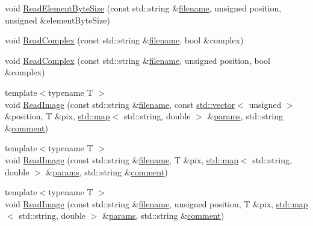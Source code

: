 \begin{DoxyCompactItemize}
\item 
void \hyperlink{class_q_s_t_e_m_1_1_i_data_reader_a00226e15483bff70932930ffafc998c9}{Read\-Element\-Byte\-Size} (const std\-::string \&\hyperlink{write_fields2_file_8m_af3723aa817dbb65282d5e1db81f08ad8}{filename}, unsigned position, unsigned \&element\-Byte\-Size)
\item 
void \hyperlink{class_q_s_t_e_m_1_1_i_data_reader_af89284225ce39d3972fb6070b01fed49}{Read\-Complex} (const std\-::string \&\hyperlink{write_fields2_file_8m_af3723aa817dbb65282d5e1db81f08ad8}{filename}, bool \&complex)
\item 
void \hyperlink{class_q_s_t_e_m_1_1_i_data_reader_a34a719cc8cd48244606d434c023eb6ab}{Read\-Complex} (const std\-::string \&\hyperlink{write_fields2_file_8m_af3723aa817dbb65282d5e1db81f08ad8}{filename}, unsigned position, bool \&complex)
\item 
{\footnotesize template$<$typename T $>$ }\\void \hyperlink{class_q_s_t_e_m_1_1_i_data_reader_ad89828f1c6fe1eb7193572ddedfae8c8}{Read\-Image} (const std\-::string \&\hyperlink{write_fields2_file_8m_af3723aa817dbb65282d5e1db81f08ad8}{filename}, const \hyperlink{qmb_8m_af54b69a32590de218622e869b06b47b3}{std\-::vector}$<$ unsigned $>$ \&position, T \&pix, \hyperlink{_displacement_params_8m_af619c74fd72bdb64d115463dff2720cd}{std\-::map}$<$ std\-::string, double $>$ \&\hyperlink{image_sim_8m_ad57b218fb254a1624c09ad71cb6b6415}{params}, std\-::string \&\hyperlink{image_sim_8m_aea4cc4bd8e43a7f8ebf9b0ee3da8d681}{comment})
\item 
{\footnotesize template$<$typename T $>$ }\\void \hyperlink{class_q_s_t_e_m_1_1_i_data_reader_a6ade8b136d9e08dc1f113c02c9dad1ed}{Read\-Image} (const std\-::string \&\hyperlink{write_fields2_file_8m_af3723aa817dbb65282d5e1db81f08ad8}{filename}, T \&pix, \hyperlink{_displacement_params_8m_af619c74fd72bdb64d115463dff2720cd}{std\-::map}$<$ std\-::string, double $>$ \&\hyperlink{image_sim_8m_ad57b218fb254a1624c09ad71cb6b6415}{params}, std\-::string \&\hyperlink{image_sim_8m_aea4cc4bd8e43a7f8ebf9b0ee3da8d681}{comment})
\item 
{\footnotesize template$<$typename T $>$ }\\void \hyperlink{class_q_s_t_e_m_1_1_i_data_reader_a88d80adb581690d9caaca8f692a9a094}{Read\-Image} (const std\-::string \&\hyperlink{write_fields2_file_8m_af3723aa817dbb65282d5e1db81f08ad8}{filename}, unsigned position, T \&pix, \hyperlink{_displacement_params_8m_af619c74fd72bdb64d115463dff2720cd}{std\-::map}$<$ std\-::string, double $>$ \&\hyperlink{image_sim_8m_ad57b218fb254a1624c09ad71cb6b6415}{params}, std\-::string \&\hyperlink{image_sim_8m_aea4cc4bd8e43a7f8ebf9b0ee3da8d681}{comment})
\end{DoxyCompactItemize}
